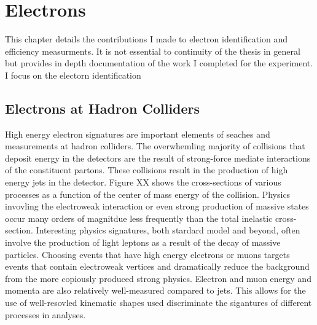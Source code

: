 \chapter[Electrons][Electrons]{Electrons}
\label{chapter:electron} 
This chapter details the contributions I made to electron identification and efficiency measurments. It is not essential to continuity of the thesis in general but provides in depth documentation of the work I completed for the experiment. I focus on the electorn identification

\section{Electrons at Hadron Colliders}

High energy electron signatures are important elements of seaches and measurements at hadron colliders. The overwhemling majority of collisions that deposit energy in the detectors are the result of strong-force mediate interactions of the constituent partons. These collisions result in the production of high energy jets in the detector. Figure XX shows the cross-sections of various processes as a function of the center of mass energy of the collision. Physics invovling the electroweak interaction or even strong production of massive states occur many orders of magnitdue less frequently than the total inelastic cross-section. 
Interesting physics signatures, both stardard model and beyond, often involve the production of light leptons as a result of the decay of massive particles. Choosing events that have high energy electrons or muons targets events that contain electroweak vertices and dramatically reduce the background from the more copiously produced strong physics. Electron and muon energy and momenta are also relatively well-measured compared to jets. This allows for the use of well-resovled kinematic shapes used discriminate the sigantures of different processes in analyses. 

